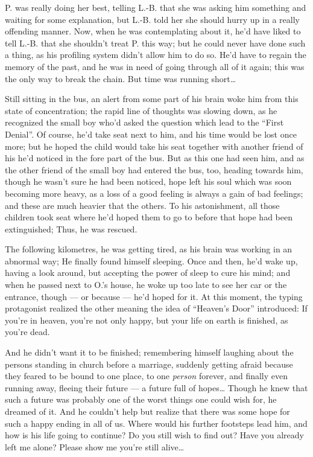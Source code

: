 P. was really doing her best, telling L.-B. that she was asking him something and waiting for some explanation, but L.-B. told her she should hurry up in a really offending manner. Now, when he was contemplating about it, he'd have liked to tell L.-B. that she shouldn't treat P. this way; but he could never have done such a thing, as his profiling system didn't allow him to do so. 
He'd have to regain the memory of the past, and he was in need of going through all of it again; this was the only way to break the chain. But time was running short\ldots

Still sitting in the bus, an alert from some part of his brain woke him from this state of concentration; the rapid line of thoughts was slowing down, as he recognized the small boy who'd asked the question which lead to the \enquote{First Denial}. Of course, he'd take seat next to him, and his time would be lost once more; but he hoped the child would take his seat together with another friend of his he'd noticed in the fore part of the bus. But as this one had seen him, and as the other friend of the small boy had entered the bus, too, heading towards him, though he wasn't sure he had been noticed, hope left his soul which was soon becoming more heavy, as a loss of a good feeling is always a gain of bad feelings; and these are much heavier that the others. To his astonishment, all those children took seat where he'd hoped them to go to before that hope had been extinguished; Thus, he was rescued.

The following kilometres, he was getting tired, as his brain was working in an abnormal way; He finally found himself sleeping. Once and then, he'd wake up, having a look around, but accepting the power of sleep to cure his mind; and when he passed next to O.'s house, he woke up too late to see her car or the entrance, though --- or because --- he'd hoped for it. At this moment, the typing protagonist realized the other meaning the idea of \enquote{Heaven's Door} introduced: If you're in heaven, you're not only happy, but your life on earth is finished, as you're dead.

And he didn't want it to be finished; remembering himself laughing about the persons standing in church before a marriage, suddenly getting afraid because they feared to be bound to one place, to one \emph{person} forever, and finally even running away, fleeing their future --- a future full of hopes\ldots
Though he knew that such a future was probably one of the worst things one could wish for, he dreamed of it. 
And he couldn't help but realize that there was some hope for such a happy ending in all of us. 
Where would his further footsteps lead him, and how is his life going to continue?
Do you still wish to find out?
Have you already left me alone?
Please show me you're still alive\ldots


